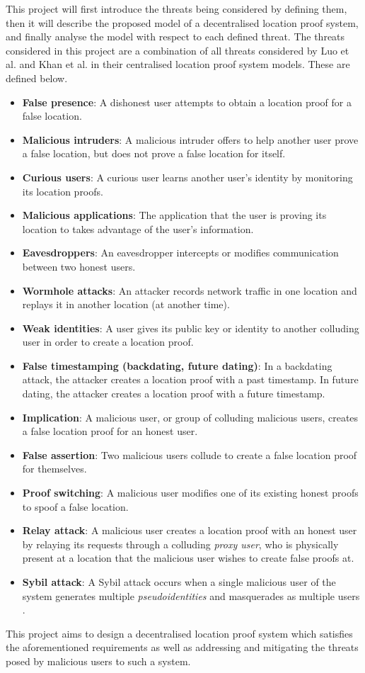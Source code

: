 This project will first introduce the threats being considered by defining them, then it will describe the proposed model of a decentralised location proof system, and finally analyse the model with respect to each defined threat. The threats considered in this project are a combination of all threats considered by Luo et al. \cite{luo} and Khan et al. \cite{khan} in their centralised location proof system models. These are defined below.

\begin{itemize}
	\item[] \textbf{False presence}: A dishonest user attempts to obtain a location proof for a false location.
	\item[] \textbf{Malicious intruders}: A malicious intruder offers to help another user prove a false location, but does not prove a false location for itself.
	\item[] \textbf{Curious users}: A curious user learns another user's identity by monitoring its location proofs.
	\item[] \textbf{Malicious applications}: The application that the user is proving its location to takes advantage of the user's information.
	\item[] \textbf{Eavesdroppers}: An eavesdropper intercepts or modifies communication between two honest users.
	\item[] \textbf{Wormhole attacks}: An attacker records network traffic in one location and replays it in another location (at another time).
	\item[] \textbf{Weak identities}: A user gives its public key or identity to another colluding user in order to create a location proof.
	\item[] \textbf{False timestamping (backdating, future dating)}: In a backdating attack, the attacker creates a location proof with a past timestamp. In future dating, the attacker creates a location proof with a future timestamp.
	\item[] \textbf{Implication}: A malicious user, or group of colluding malicious users, creates a false location proof for an honest user.
	\item[] \textbf{False assertion}: Two malicious users collude to create a false location proof for themselves.
	\item[] \textbf{Proof switching}: A malicious user modifies one of its existing honest proofs to spoof a false location.
	\item[] \textbf{Relay attack}: A malicious user creates a location proof with an honest user by relaying its requests through a colluding \textit{proxy user}, who is physically present at a location that the malicious user wishes to create false proofs at.
	\item[] \textbf{Sybil attack}: A Sybil attack occurs when a single malicious user of the system generates multiple \textit{pseudoidentities} and masquerades as multiple users \cite{sybil}.
\end{itemize}

This project aims to design a decentralised location proof system which satisfies the aforementioned requirements as well as addressing and mitigating the threats posed by malicious users to such a system.